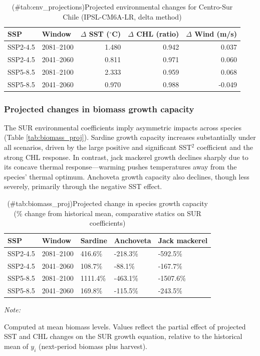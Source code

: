 \documentclass[
  11pt,
]{article}
\begin{document}
\begin{table}[!h]
\centering
\caption{(\#tab:env_projections)Projected environmental changes for Centro-Sur Chile (IPSL-CM6A-LR, delta method)}
\centering
\fontsize{10}{12}\selectfont
\begin{tabular}[t]{llrrr}
\toprule
SSP & Window & $\Delta$ SST ($^\circ$C) & $\Delta$ CHL (ratio) & $\Delta$ Wind (m/s)\\
\midrule
SSP2-4.5 & 2081--2100 & 1.480 & 0.942 & 0.037\\
SSP2-4.5 & 2041--2060 & 0.811 & 0.971 & 0.060\\
SSP5-8.5 & 2081--2100 & 2.333 & 0.959 & 0.068\\
SSP5-8.5 & 2041--2060 & 0.970 & 0.988 & -0.049\\
\bottomrule
\end{tabular}
\end{table}

\subsubsection{Projected changes in biomass growth capacity}\label{projected-changes-in-biomass-growth-capacity}

The SUR environmental coefficients imply asymmetric impacts across species (Table \ref{tab:biomass_proj}). Sardine growth capacity increases substantially under all scenarios, driven by the large positive and significant SST\(^2\) coefficient and the strong CHL response. In contrast, jack mackerel growth declines sharply due to its concave thermal response---warming pushes temperatures away from the species' thermal optimum. Anchoveta growth capacity also declines, though less severely, primarily through the negative SST effect.

\begin{table}[!h]
\centering
\caption{(\#tab:biomass_proj)Projected change in species growth capacity (\% change from historical mean, comparative statics on SUR coefficients)}
\centering
\fontsize{10}{12}\selectfont
\begin{threeparttable}
\begin{tabular}[t]{lllll}
\toprule
SSP & Window & Sardine & Anchoveta & Jack mackerel\\
\midrule
SSP2-4.5 & 2081--2100 & 416.6\% & -218.3\% & -592.5\%\\
SSP2-4.5 & 2041--2060 & 108.7\% & -88.1\% & -167.7\%\\
SSP5-8.5 & 2081--2100 & 1111.4\% & -463.1\% & -1507.6\%\\
SSP5-8.5 & 2041--2060 & 169.8\% & -115.5\% & -243.5\%\\
\bottomrule
\end{tabular}
\begin{tablenotes}
\item \textit{Note:} 
\item Computed at mean biomass levels. Values reflect the partial effect of projected SST and CHL changes on the SUR growth equation, relative to the historical mean of $y_i$ (next-period biomass plus harvest).
\end{tablenotes}
\end{threeparttable}
\end{table}
\end{document}
